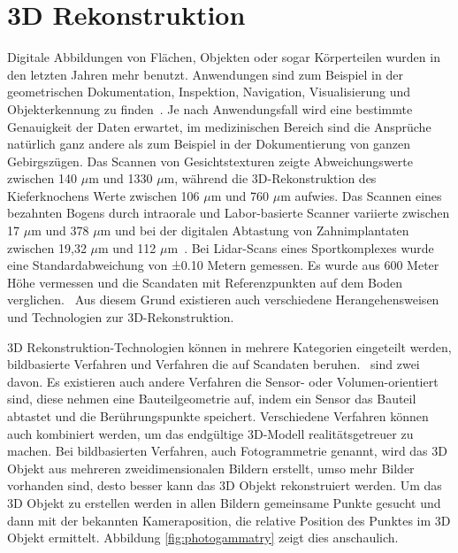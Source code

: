 \section{3D Rekonstruktion}

Digitale Abbildungen von Flächen, Objekten oder sogar Körperteilen wurden in den
letzten Jahren mehr benutzt. Anwendungen sind zum Beispiel in der
geometrischen Dokumentation, Inspektion, Navigation, Visualisierung und 
Objekterkennung zu finden~\cite{Verykokou.2023}. Je nach Anwendungsfall wird eine
bestimmte Genauigkeit
der Daten erwartet, im medizinischen Bereich sind die Ansprüche natürlich ganz 
andere als zum Beispiel in der Dokumentierung von ganzen Gebirgszügen.
Das Scannen von Gesichtstexturen zeigte Abweichungswerte zwischen 140 $\mu$m und 
1330 $\mu$m, während die 3D-Rekonstruktion des Kieferknochens Werte zwischen 106 $\mu$m 
und 760 $\mu$m aufwies. 
Das Scannen eines bezahnten Bogens durch intraorale und Labor-basierte
Scanner variierte zwischen 17 $\mu$m und 378 $\mu$m und bei der 
digitalen Abtastung von Zahnimplantaten zwischen 19,32 $\mu$m
und 112 $\mu$m~\cite{Bohner.2019}.
Bei Lidar-Scans eines Sportkomplexes wurde eine Standardabweichung von ±0.10 Metern
gemessen. Es wurde aus 600 Meter Höhe vermessen und die Scandaten mit 
Referenzpunkten auf dem Boden verglichen.~\cite{Elaksher.2023}
Aus diesem Grund existieren auch verschiedene Herangehensweisen und Technologien  
zur 3D-Rekonstruktion.

3D Rekonstruktion-Technologien können in mehrere Kategorien eingeteilt werden,
bildbasierte Verfahren und  Verfahren die auf Scandaten 
beruhen.~\cite{Verykokou.2023} sind zwei davon.
Es existieren auch andere Verfahren die Sensor- oder Volumen-orientiert sind, 
diese nehmen eine Bauteilgeometrie auf, indem ein Sensor das Bauteil abtastet 
und die Berührungspunkte speichert.
Verschiedene Verfahren können auch kombiniert werden, um das endgültige 3D-Modell
realitätsgetreuer zu machen.
Bei bildbasierten Verfahren, auch Fotogrammetrie genannt, wird das 3D Objekt aus
mehreren zweidimensionalen Bildern erstellt, 
umso mehr Bilder vorhanden sind, desto besser kann das
3D Objekt rekonstruiert werden. Um das 3D Objekt zu erstellen werden in 
allen Bildern gemeinsame Punkte gesucht und dann mit der bekannten Kameraposition, 
die relative Position des Punktes im 3D Objekt ermittelt. 
Abbildung \ref{fig:photogammatry} zeigt dies anschaulich.


